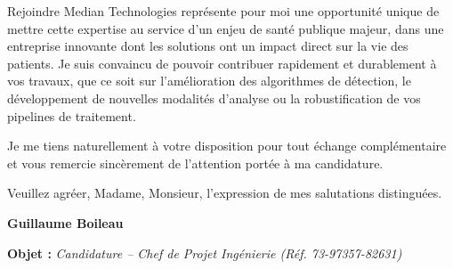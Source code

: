 \documentclass[11pt,a4paper]{altacv}
\begin{document}
{Rejoindre Median Technologies représente pour moi une opportunité unique de mettre cette expertise au service d'un enjeu de santé publique majeur, dans une entreprise innovante dont les solutions ont un impact direct sur la vie des patients. Je suis convaincu de pouvoir contribuer rapidement et durablement à vos travaux, que ce soit sur l'amélioration des algorithmes de détection, le développement de nouvelles modalités d'analyse ou la robustification de vos pipelines de traitement.

Je me tiens naturellement à votre disposition pour tout échange complémentaire et vous remercie sincèrement de l'attention portée à ma candidature.

Veuillez agréer, Madame, Monsieur, l'expression de mes salutations distinguées.

\textbf{Guillaume Boileau}

}

{\color{accent}\textbf{Objet :}} \textit{Candidature -- Chef de Projet Ingénierie (Réf. 73-97357-82631)}
\end{document}
